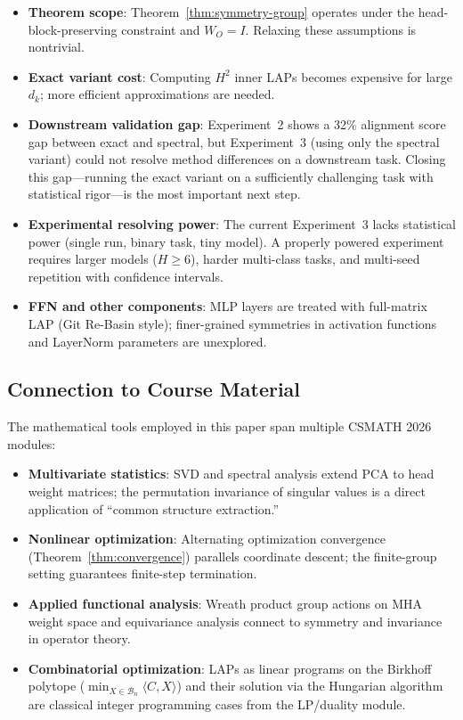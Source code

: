 \begin{itemize}
    \item \textbf{Theorem scope}: Theorem~\ref{thm:symmetry-group} operates under the head-block-preserving constraint and $W_O = I$. Relaxing these assumptions is nontrivial.
    \item \textbf{Exact variant cost}: Computing $H^2$ inner LAPs becomes expensive for large $d_k$; more efficient approximations are needed.
    \item \textbf{Downstream validation gap}: Experiment~2 shows a 32\% alignment score gap between exact and spectral, but Experiment~3 (using only the spectral variant) could not resolve method differences on a downstream task. Closing this gap---running the exact variant on a sufficiently challenging task with statistical rigor---is the most important next step.
    \item \textbf{Experimental resolving power}: The current Experiment~3 lacks statistical power (single run, binary task, tiny model). A properly powered experiment requires larger models ($H \geq 6$), harder multi-class tasks, and multi-seed repetition with confidence intervals.
    \item \textbf{FFN and other components}: MLP layers are treated with full-matrix LAP (Git Re-Basin style); finer-grained symmetries in activation functions and LayerNorm parameters are unexplored.
\end{itemize}

\subsection{Connection to Course Material}

The mathematical tools employed in this paper span multiple CSMATH 2026 modules:
\begin{itemize}
    \item \textbf{Multivariate statistics}: SVD and spectral analysis extend PCA to head weight matrices; the permutation invariance of singular values is a direct application of ``common structure extraction.''
    \item \textbf{Nonlinear optimization}: Alternating optimization convergence (Theorem~\ref{thm:convergence}) parallels coordinate descent; the finite-group setting guarantees finite-step termination.
    \item \textbf{Applied functional analysis}: Wreath product group actions on MHA weight space and equivariance analysis connect to symmetry and invariance in operator theory.
    \item \textbf{Combinatorial optimization}: LAPs as linear programs on the Birkhoff polytope ($\min_{X \in \mathcal{B}_n} \langle C, X \rangle$) and their solution via the Hungarian algorithm~\cite{Kuhn1955,Birkhoff1946} are classical integer programming cases from the LP/duality module.
\end{itemize}

